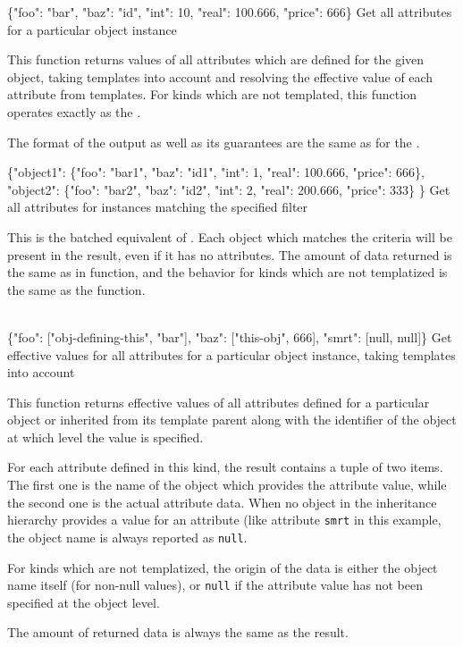 \documentclass[deska]{subfiles}
\begin{document}
    {\{"foo": "bar", "baz": "id", "int": 10, "real": 100.666, "price": 666\}}
    {Get all attributes for a particular object instance}
    {This function returns values of all attributes which are defined for the given object, taking templates into
    account and resolving the effective value of each attribute from templates.  For kinds which are not templated,
    this function operates exactly as the .

    The format of the output as well as its guarantees are the same as for the .

    \deskaUnsortedRes
    }

    {\{"object1": \{"foo": "bar1", "baz": "id1", "int": 1, "real": 100.666, "price": 666\}, \\
       "object2": \{"foo": "bar2", "baz": "id2", "int": 2, "real": 200.666, "price": 333\}
      \}}
    {Get all attributes for instances matching the specified filter}
    {This is the batched equivalent of .  Each object which matches the criteria will
    be present in the result, even if it has no attributes.  The amount of data returned is the same as in
     function, and the behavior for kinds which are not templatized is the same as
    the  function.

    \deskaUnsortedRes}

    {\\ \{"foo": ["obj-defining-this", "bar"], "baz": ["this-obj", 666], "smrt": [null, null]\}}
    {Get effective values for all attributes for a particular object instance, taking templates into account}
    {This function returns effective values of all attributes defined for a particular object or inherited from its
    template parent along with the identifier of the object at which level the value is specified.

    For each attribute defined in this kind, the result contains a tuple of two items.  The first one is the name of the
    object which provides the attribute value, while the second one is the actual attribute data.  When no object in the
    inheritance hierarchy provides a value for an attribute (like attribute {\tt smrt} in this example, the object name
    is always reported as {\tt null}.

    For kinds which are not templatized, the origin of the data is either the object name itself (for non-null values),
    or {\tt null} if the attribute value has not been specified at the object level.

    The amount of returned data is always the same as the  result.  \deskaUnsortedRes}
\end{document}
